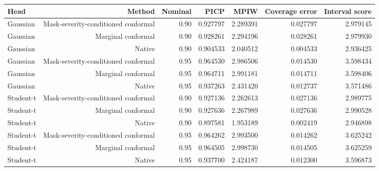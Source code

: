 \begin{tabular}{@{}lrrrrrr@{}}
\toprule
Head & Method & Nominal & PICP & MPIW & Coverage error & Interval score \\
\midrule
Gaussian & Mask-severity-conditioned conformal & 0.90 & 0.927797 & 2.289391 & 0.027797 & 2.979145 \\
Gaussian & Marginal conformal & 0.90 & 0.928261 & 2.294196 & 0.028261 & 2.979930 \\
Gaussian & Native & 0.90 & 0.904533 & 2.040512 & 0.004533 & 2.936425 \\
Gaussian & Mask-severity-conditioned conformal & 0.95 & 0.964530 & 2.986506 & 0.014530 & 3.598434 \\
Gaussian & Marginal conformal & 0.95 & 0.964711 & 2.991181 & 0.014711 & 3.598406 \\
Gaussian & Native & 0.95 & 0.937263 & 2.431420 & 0.012737 & 3.571486 \\
Student-t & Mask-severity-conditioned conformal & 0.90 & 0.927136 & 2.262613 & 0.027136 & 2.989775 \\
Student-t & Marginal conformal & 0.90 & 0.927636 & 2.267989 & 0.027636 & 2.990528 \\
Student-t & Native & 0.90 & 0.897581 & 1.953189 & 0.002419 & 2.946898 \\
Student-t & Mask-severity-conditioned conformal & 0.95 & 0.964262 & 2.993500 & 0.014262 & 3.625242 \\
Student-t & Marginal conformal & 0.95 & 0.964505 & 2.998730 & 0.014505 & 3.625259 \\
Student-t & Native & 0.95 & 0.937700 & 2.424187 & 0.012300 & 3.596873 \\
\bottomrule
\end{tabular}
